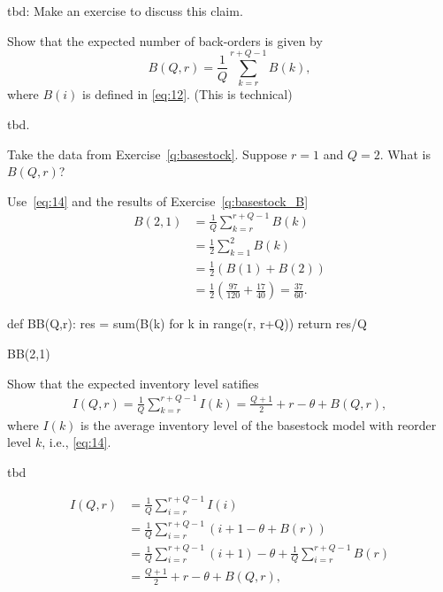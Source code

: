\begin{exercise}
tbd:  Make an exercise to discuss this claim.
\end{exercise}

\begin{exercise}
Show that the expected number of back-orders is  given by
\begin{equation}
  \label{eq:14}
   B(Q,r) = \frac1Q \sum_{k=r}^{r+Q-1} B(k),
\end{equation}
where $B(i)$ is defined in \eqref{eq:12}. (This is technical)
\begin{solution}
tbd.
\end{solution}
\end{exercise}


\begin{exercise}
  Take the data from Exercise~\ref{q:basestock}. Suppose $r=1$ and $Q=2$. What is $B(Q,r)$?
\begin{solution}
Use~\eqref{eq:14} and the results of Exercise~\ref{q:basestock_B}
  \begin{align*}
      B(2,1)
&= \frac1Q \sum_{k=r}^{r+Q-1} B(k) \\
&= \frac12 \sum_{k=1}^{2} B(k) \\
&= \frac12 (B(1) + B(2)) \\
&= \frac12 \left(\frac{97}{120} + \frac{17}{40}\right) = \frac{37}{60}.
\end{align*}

\begin{pyconsole}
def BB(Q,r):
    res = sum(B(k) for k in range(r, r+Q))
    return res/Q

BB(2,1)
\end{pyconsole}
\end{solution}
\end{exercise}


\begin{exercise}[\faRocket]
Show that  the expected inventory level satifies
\begin{align}\label{eq:2}
   I(Q,r)
   = \frac1Q\sum_{k=r}^{r+Q-1} I(k)
   = \frac{Q+1}2 + r - \theta + B(Q,r), 
\end{align}
where $I(k)$ is the average inventory level of the basestock model with reorder level $k$, i.e.,  \eqref{eq:14}.
\begin{solution}
tbd

\begin{align*}
   I(Q,r)
   &= \frac1Q\sum_{i=r}^{r+Q-1} I(i) \\
   &= \frac1Q\sum_{i=r}^{r+Q-1} (i+1 - \theta + B(r)) \\
   &= \frac1Q\sum_{i=r}^{r+Q-1} (i + 1)  - \theta + \frac1Q\sum_{i=r}^{r+Q-1} B(r) \\
   &= \frac{Q+1}2 + r - \theta + B(Q,r), 
\end{align*}

\end{solution}
\end{exercise}




